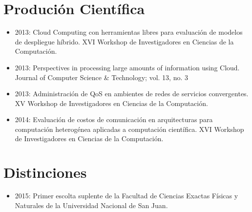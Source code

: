 \documentclass[letterpaper,11pt]{article}
\newcommand{\resumeSubHeadingListStart}{\begin{itemize}[leftmargin=*]}
\newcommand{\resumeSubHeadingListEnd}{\end{itemize}}
\begin{document}
 \section{Produción Científica}
 \resumeSubHeadingListStart
   \item{
      2013: Cloud Computing con herramientas libres para evaluación de modelos de despliegue híbrido. XVI Workshop de Investigadores en Ciencias de la Computación. 
    }
    \item{
      2013: Perspectives in processing large amounts of information using Cloud. Journal of Computer Science \& Technology; vol. 13, no. 3 
    }
    \item{
      2013: Administración de QoS en ambientes de redes de servicios convergentes. XV Workshop de Investigadores en Ciencias de la Computación. 
    }
    \item{
      2014: Evaluación de costos de comunicación en arquitecturas para computación heterogénea aplicadas a computación científica. XVI Workshop de Investigadores en Ciencias de la Computación. 
    }
 \resumeSubHeadingListEnd

 \section{Distinciones}
 \resumeSubHeadingListStart
   \item{
      2015: Primer escolta suplente de la Facultad de Ciencias Exactas Físicas y Naturales de la Universidad Nacional de San Juan.  
    }
 \resumeSubHeadingListEnd
\end{document}
